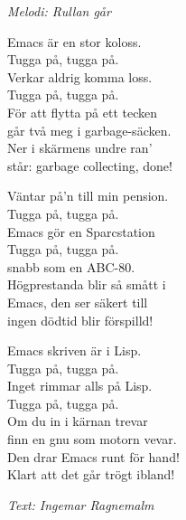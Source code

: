 {\footnotesize\textit{Melodi: Rullan går}}\par
\vspace{10pt}
Emacs är en stor koloss.\\
Tugga på, tugga på.\\
Verkar aldrig komma loss.\\
Tugga på, tugga på.\\
För att flytta på ett tecken\\
går två meg i garbage-säcken.\\
Ner i skärmens undre ran’\\
står: garbage collecting, done!\par
\vspace{10pt}
Väntar på’n till min pension.\\
Tugga på, tugga på.\\
Emacs gör en Sparcstation\\
Tugga på, tugga på.\\
snabb som en ABC-80.\\
Högprestanda blir så smått i\\
Emacs, den ser säkert till\\
ingen dödtid blir förspilld!\par
\vspace{10pt}
Emacs skriven är i Lisp.\\
Tugga på, tugga på.\\
Inget rimmar alls på Lisp.\\
Tugga på, tugga på.\\
Om du in i kärnan trevar\\
finn en gnu som motorn vevar.\\
Den drar Emacs runt för hand!\\
Klart att det går trögt ibland!\par
\vspace{10pt}
{\footnotesize\textit{Text: Ingemar Ragnemalm }}
